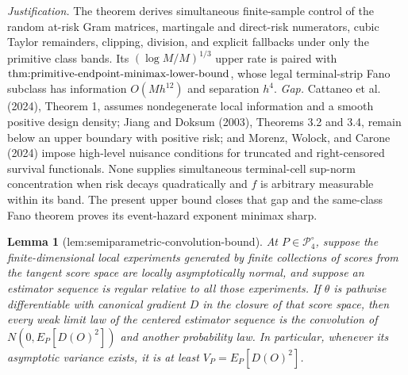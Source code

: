 \documentclass{article}
\newtheorem{lemma}{Lemma}
\begin{document}
\par\smallskip\noindent \textit{Justification.} The theorem derives simultaneous finite-sample control of the random at-risk Gram matrices, martingale and direct-risk numerators, cubic Taylor remainders, clipping, division, and explicit fallbacks under only the primitive class bands. Its \((\log M/M)^{1/3}\) upper rate is paired with \(\textnormal{thm:primitive-endpoint-minimax-lower-bound}\), whose legal terminal-strip Fano subclass has information \(O(Mh^{12})\) and separation \(h^4\). \textit{Gap.} Cattaneo et al. (2024), Theorem 1, assumes nondegenerate local information and a smooth positive design density; Jiang and Doksum (2003), Theorems 3.2 and 3.4, remain below an upper boundary with positive risk; and Morenz, Wolock, and Carone (2024) impose high-level nuisance conditions for truncated and right-censored survival functionals. None supplies simultaneous terminal-cell sup-norm concentration when risk decays quadratically and \(f\) is arbitrary measurable within its band. The present upper bound closes that gap and the same-class Fano theorem proves its event-hazard exponent minimax sharp.

\begin{lemma}[lem:semiparametric-convolution-bound]\label{lem:semiparametric-convolution-bound}
At \(P\in\mathcal P_4^{\circ}\), suppose the finite-dimensional local experiments generated by finite collections of scores from the tangent score space are locally asymptotically normal, and suppose an estimator sequence is regular relative to all those experiments. If \(\theta\) is pathwise differentiable with canonical gradient \(D\) in the closure of that score space, then every weak limit law of the centered estimator sequence is the convolution of \(N(0,E_P[D(O)^2])\) and another probability law. In particular, whenever its asymptotic variance exists, it is at least \(V_P=E_P[D(O)^2]\).
\end{lemma}
\end{document}
